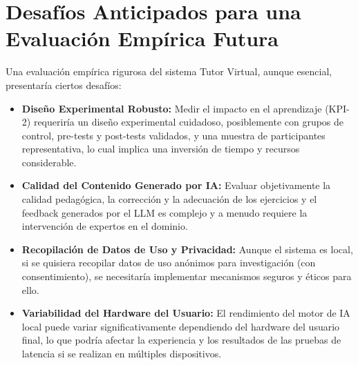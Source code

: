 \section{Desafíos Anticipados para una Evaluación Empírica Futura}
\label{sec:eval_desafios_futura_eval}

Una evaluación empírica rigurosa del sistema Tutor Virtual, aunque esencial, presentaría ciertos desafíos:

\begin{itemize}[leftmargin=*]
    \item \textbf{Diseño Experimental Robusto:} Medir el impacto en el aprendizaje (KPI-2) requeriría un diseño experimental cuidadoso, posiblemente con grupos de control, pre-tests y post-tests validados, y una muestra de participantes representativa, lo cual implica una inversión de tiempo y recursos considerable.
    \item \textbf{Calidad del Contenido Generado por IA:} Evaluar objetivamente la calidad pedagógica, la corrección y la adecuación de los ejercicios y el feedback generados por el LLM es complejo y a menudo requiere la intervención de expertos en el dominio.
    \item \textbf{Recopilación de Datos de Uso y Privacidad:} Aunque el sistema es local, si se quisiera recopilar datos de uso anónimos para investigación (con consentimiento), se necesitaría implementar mecanismos seguros y éticos para ello.
    \item \textbf{Variabilidad del Hardware del Usuario:} El rendimiento del motor de IA local puede variar significativamente dependiendo del hardware del usuario final, lo que podría afectar la experiencia y los resultados de las pruebas de latencia si se realizan en múltiples dispositivos.
\end{itemize}
